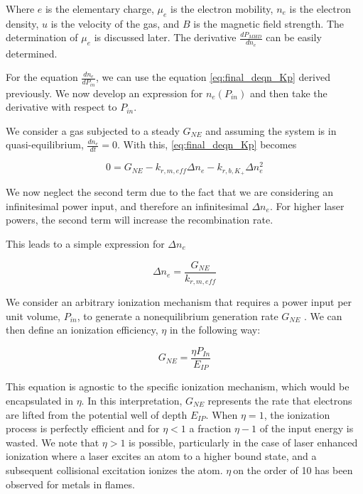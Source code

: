 Where $e$ is the elementary charge, $\mu_e$ is the electron mobility, $n_e$ is the electron density, $u$ is the velocity of the gas, and $B$ is the magnetic field strength.  The determination of $\mu_e$ is discussed later. The derivative $\frac{dP_{MHD}}{dn_{e}}$ can be easily determined. 

For the equation $\frac{dn_{e}}{dP_{in}}$, we can use the equation \ref{eq:final_deqn_Kp} derived previously. We now develop an expression for $n_{e}(P_{in})$ and then take the derivative with respect to $P_{in}$.

We consider a gas subjected to a steady $G_{NE}$ and assuming the system is in quasi-equilibrium, $\frac{dn_{e}}{dt} = 0$.  With this, \ref{eq:final_deqn_Kp} becomes

\begin{equation}
0 = G_{NE} - k_{r, m, eff}\Delta n_{e} - k_{r, b, K_{+}}\Delta n_{e}^2
\end{equation}

We now neglect the second term due to the fact that we are considering an infinitesimal power input, and therefore an infinitesimal $\Delta n_{e}$. For higher laser powers, the second term will increase the recombination rate. 

This leads to a simple expression for $\Delta n_{e}$

\begin{equation}
\Delta n_{e} = \frac{G_{NE}}{k_{r, m, eff}}
\end{equation}


We consider an arbitrary ionization mechanism that requires a power input per unit volume, \(P_{in}\), to generate a nonequilibrium generation rate \(G_{NE}\) . We can then define an ionization efficiency, \(\eta\) in the following way:

\begin{equation}
{G}_{NE} = \frac{\eta P_{In}}{E_{IP}}
\end{equation}


This equation is agnostic to the specific ionization mechanism, which would be encapsulated in \(\eta\). In this interpretation, \(G_{NE}\) represents the rate that electrons are lifted from the potential well of depth \(E_{IP}\). When \(\eta = 1\), the ionization process is perfectly efficient and for \(\eta < 1\) a fraction \(\eta - 1\) of the input energy is wasted. We note that \(\eta > 1\) is possible, particularly in the case of laser enhanced ionization where a laser excites an atom to a higher bound state, and a subsequent collisional excitation ionizes the atom. \(\eta\ \)on the order of 10 has been observed for metals in flames.\cite{turkOpticalDetectionLaserInduced1986}

